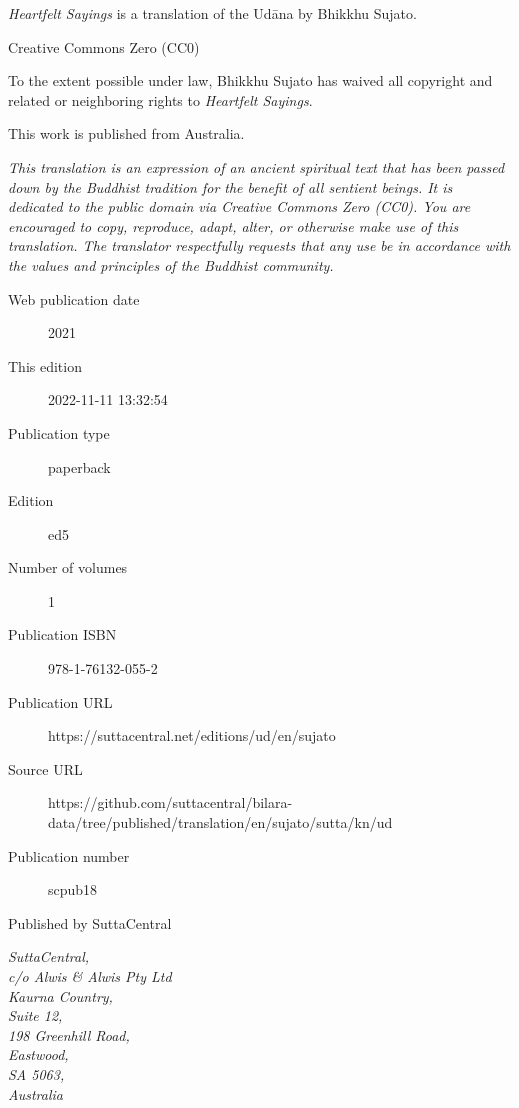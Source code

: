 \documentclass[12pt,openany]{book}%
\begin{document}
\begin{footnotesize}

\textit{Heartfelt Sayings} is a translation of the Udāna by Bhikkhu Sujato.

\medskip

Creative Commons Zero (CC0)

To the extent possible under law, Bhikkhu Sujato has waived all copyright and related or neighboring rights to \textit{Heartfelt Sayings}.

\medskip

This work is published from Australia.

\begin{center}
\textit{This translation is an expression of an ancient spiritual text that has been passed down by the Buddhist tradition for the benefit of all sentient beings. It is dedicated to the public domain via Creative Commons Zero (CC0). You are encouraged to copy, reproduce, adapt, alter, or otherwise make use of this translation. The translator respectfully requests that any use be in accordance with the values and principles of the Buddhist community.}
\end{center}

\medskip

\begin{description}
    \item[Web publication date] 2021
    \item[This edition] 2022-11-11 13:32:54
    \item[Publication type] paperback
    \item[Edition] ed5
    \item[Number of volumes] 1
    \item[Publication ISBN] 978-1-76132-055-2
    \item[Publication URL] https://suttacentral.net/editions/ud/en/sujato
    \item[Source URL] https://github.com/suttacentral/bilara-data/tree/published/translation/en/sujato/sutta/kn/ud
    \item[Publication number] scpub18
\end{description}

\medskip

Published by SuttaCentral

\medskip

\textit{SuttaCentral,\\
c/o Alwis \& Alwis Pty Ltd\\
Kaurna Country,\\
Suite 12,\\
198 Greenhill Road,\\
Eastwood,\\
SA 5063,\\
Australia}

\end{footnotesize}
\end{document}
